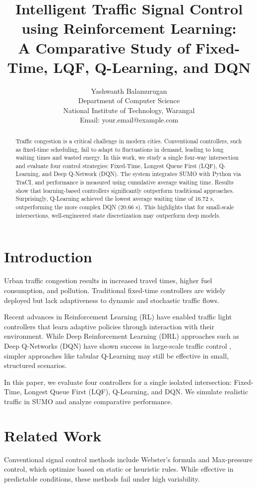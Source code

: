 \documentclass[conference]{IEEEtran}
\title{Intelligent Traffic Signal Control using Reinforcement Learning: \\ 
A Comparative Study of Fixed-Time, LQF, Q-Learning, and DQN}
\author{
    Yashwanth Balamurugan \\ 
    Department of Computer Science \\ 
    National Institute of Technology, Warangal \\ 
    Email: your.email@example.com
}
\begin{document}
\maketitle

\begin{abstract}
Traffic congestion is a critical challenge in modern cities. Conventional controllers, such as fixed-time scheduling, fail to adapt to fluctuations in demand, leading to long waiting times and wasted energy. In this work, we study a single four-way intersection and evaluate four control strategies: Fixed-Time, Longest Queue First (LQF), Q-Learning, and Deep Q-Network (DQN). The system integrates SUMO with Python via TraCI, and performance is measured using cumulative average waiting time. Results show that learning-based controllers significantly outperform traditional approaches. Surprisingly, Q-Learning achieved the lowest average waiting time of 16.72 s, outperforming the more complex DQN (20.66 s). This highlights that for small-scale intersections, well-engineered state discretization may outperform deep models.
\end{abstract}

\section{Introduction}
Urban traffic congestion results in increased travel times, higher fuel consumption, and pollution. Traditional fixed-time controllers are widely deployed but lack adaptiveness to dynamic and stochastic traffic flows.  

Recent advances in Reinforcement Learning (RL) have enabled traffic light controllers that learn adaptive policies through interaction with their environment. While Deep Reinforcement Learning (DRL) approaches such as Deep Q-Networks (DQN) have shown success in large-scale traffic control \cite{mnih2015,wei2018}, simpler approaches like tabular Q-Learning may still be effective in small, structured scenarios.  

In this paper, we evaluate four controllers for a single isolated intersection: Fixed-Time, Longest Queue First (LQF), Q-Learning, and DQN. We simulate realistic traffic in SUMO and analyze comparative performance.

\section{Related Work}
Conventional signal control methods include Webster’s formula and Max-pressure control, which optimize based on static or heuristic rules. While effective in predictable conditions, these methods fail under high variability.  
\end{document}
